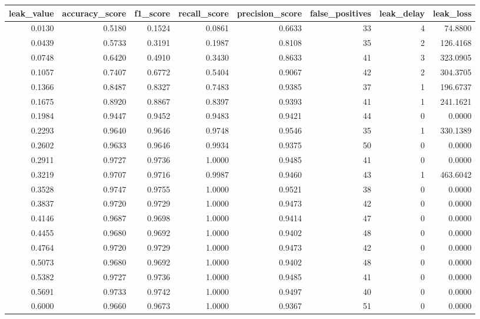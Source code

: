\begin{tabular}{rrrrrrrr}
\toprule
leak\_value & accuracy\_score & f1\_score & recall\_score & precision\_score & false\_positives & leak\_delay & leak\_loss \\
\midrule
0.0130 & 0.5180 & 0.1524 & 0.0861 & 0.6633 & 33 & 4 & 74.8800 \\
0.0439 & 0.5733 & 0.3191 & 0.1987 & 0.8108 & 35 & 2 & 126.4168 \\
0.0748 & 0.6420 & 0.4910 & 0.3430 & 0.8633 & 41 & 3 & 323.0905 \\
0.1057 & 0.7407 & 0.6772 & 0.5404 & 0.9067 & 42 & 2 & 304.3705 \\
0.1366 & 0.8487 & 0.8327 & 0.7483 & 0.9385 & 37 & 1 & 196.6737 \\
0.1675 & 0.8920 & 0.8867 & 0.8397 & 0.9393 & 41 & 1 & 241.1621 \\
0.1984 & 0.9447 & 0.9452 & 0.9483 & 0.9421 & 44 & 0 & 0.0000 \\
0.2293 & 0.9640 & 0.9646 & 0.9748 & 0.9546 & 35 & 1 & 330.1389 \\
0.2602 & 0.9633 & 0.9646 & 0.9934 & 0.9375 & 50 & 0 & 0.0000 \\
0.2911 & 0.9727 & 0.9736 & 1.0000 & 0.9485 & 41 & 0 & 0.0000 \\
0.3219 & 0.9707 & 0.9716 & 0.9987 & 0.9460 & 43 & 1 & 463.6042 \\
0.3528 & 0.9747 & 0.9755 & 1.0000 & 0.9521 & 38 & 0 & 0.0000 \\
0.3837 & 0.9720 & 0.9729 & 1.0000 & 0.9473 & 42 & 0 & 0.0000 \\
0.4146 & 0.9687 & 0.9698 & 1.0000 & 0.9414 & 47 & 0 & 0.0000 \\
0.4455 & 0.9680 & 0.9692 & 1.0000 & 0.9402 & 48 & 0 & 0.0000 \\
0.4764 & 0.9720 & 0.9729 & 1.0000 & 0.9473 & 42 & 0 & 0.0000 \\
0.5073 & 0.9680 & 0.9692 & 1.0000 & 0.9402 & 48 & 0 & 0.0000 \\
0.5382 & 0.9727 & 0.9736 & 1.0000 & 0.9485 & 41 & 0 & 0.0000 \\
0.5691 & 0.9733 & 0.9742 & 1.0000 & 0.9497 & 40 & 0 & 0.0000 \\
0.6000 & 0.9660 & 0.9673 & 1.0000 & 0.9367 & 51 & 0 & 0.0000 \\
\bottomrule
\end{tabular}
